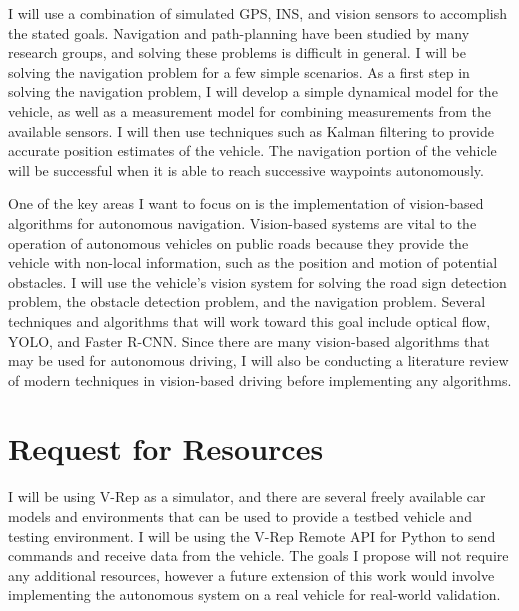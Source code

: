 \documentclass[11pt]{article}
\begin{document}
I will use a combination of simulated GPS, INS, and vision sensors to accomplish the stated goals.  Navigation and path-planning have been studied by many research groups, and solving these problems is difficult in general.  I will be solving the navigation problem for a few simple scenarios.  As a first step in solving the navigation problem, I will develop a simple dynamical model for the vehicle, as well as a measurement model for combining measurements from the available sensors.  I will then use techniques such as Kalman filtering to provide accurate position estimates of the vehicle.  The navigation portion of the vehicle will be successful when it is able to reach successive waypoints autonomously.

One of the key areas I want to focus on is the implementation of vision-based algorithms for autonomous navigation.  Vision-based systems are vital to the operation of autonomous vehicles on public roads because they provide the vehicle with non-local information, such as the position and motion of potential obstacles.  I will use the vehicle's vision system for solving the road sign detection problem, the obstacle detection problem, and the navigation problem.  Several techniques and algorithms that will work toward this goal include optical flow, YOLO, and Faster R-CNN.  Since there are many vision-based algorithms that may be used for autonomous driving, I will also be conducting a literature review of modern techniques in vision-based driving before implementing any algorithms.

\section{Request for Resources}
I will be using V-Rep as a simulator, and there are several freely available car models and environments that can be used to provide a testbed vehicle and testing environment.  I will be using the V-Rep Remote API for Python to send commands and receive data from the vehicle.  The goals I propose will not require any additional resources, however a future extension of this work would involve implementing the autonomous system on a real vehicle for real-world validation.
\end{document}

